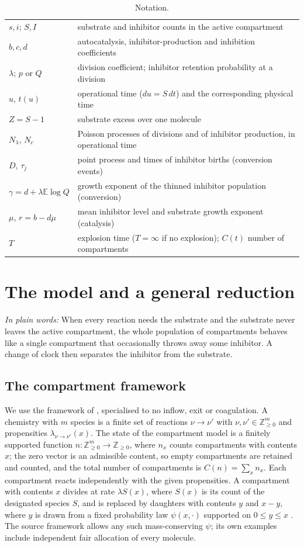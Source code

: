 \documentclass[11pt,a4paper]{article}
\numberwithin{equation}{section}
\theoremstyle{definition}\newtheorem{definition}[theorem]{Definition}
\theoremstyle{remark}\newtheorem{remark}[theorem]{Remark}\newtheorem{example}[theorem]{Example}
\newcommand{\E}{\mathbb E}
\newcommand{\Z}{\mathbb Z}
\newcommand{\takeaway}[1]{\par\smallskip\noindent\textit{In plain words:} #1\par\smallskip}
\begin{document}
\begin{table}[ht]
\centering\small
\caption{Notation.}\label{tab:notation}
\begin{tabular}{@{}ll@{}}
\toprule
$s,i$; $S,I$ & substrate and inhibitor counts in the active compartment\\
$b,c,d$ & autocatalysis, inhibitor-production and inhibition coefficients\\
$\lambda$; $p$ or $Q$ & division coefficient; inhibitor retention probability at a division\\
$u$, $t(u)$ & operational time ($du=S\,dt$) and the corresponding physical time\\
$Z=S-1$ & substrate excess over one molecule\\
$N_\lambda$, $N_c$ & Poisson processes of divisions and of inhibitor production, in operational time\\
$D$, $\tau_j$ & point process and times of inhibitor births (conversion events)\\
$\gamma=d+\lambda\E\log Q$ & growth exponent of the thinned inhibitor population (conversion)\\
$\mu$, $r=b-d\mu$ & mean inhibitor level and substrate growth exponent (catalysis)\\
$T$ & explosion time ($T=\infty$ if no explosion); $C(t)$ number of compartments\\
\bottomrule
\end{tabular}
\end{table}
\section{The model and a general reduction}\label{sec:model}
\takeaway{When every reaction needs the substrate and the substrate never leaves the active compartment, the whole population of compartments behaves like a single compartment that occasionally throws away some inhibitor. A change of clock then separates the inhibitor from the substrate.}

\subsection{The compartment framework}\label{sec:framework}
We use the framework of \cite[\S2.2]{AHRLL2026}, specialised to no inflow, exit or coagulation. A chemistry with $m$ species is a finite set of reactions $\nu\to\nu'$ with $\nu,\nu'\in\Z_{\ge0}^m$ and propensities $\lambda_{\nu\to\nu'}(x)$. The state of the compartment model is a finitely supported function $n:\Z_{\ge0}^m\to\Z_{\ge0}$, where $n_x$ counts compartments with contents $x$; the zero vector is an admissible content, so empty compartments are retained and counted, and the total number of compartments is $C(n)=\sum_xn_x$. Each compartment reacts independently with the given propensities. A compartment with contents $x$ divides at rate $\lambda S(x)$, where $S(x)$ is its count of the designated species $S$, and is replaced by daughters with contents $y$ and $x-y$, where $y$ is drawn from a fixed probability law $\psi(x,\cdot)$ supported on $0\le y\le x$ \cite[\S2.2]{AHRLL2026}. The source framework allows any such mass-conserving $\psi$; its own examples include independent fair allocation of every molecule.
\end{document}
